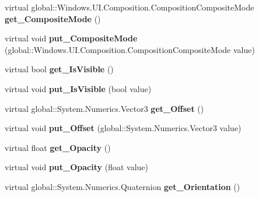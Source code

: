 \begin{DoxyCompactItemize}
virtual global\+::\+Windows.\+U\+I.\+Composition.\+Composition\+Composite\+Mode {\bfseries get\+\_\+\+Composite\+Mode} ()
\item 
\mbox{\label{class_windows_1_1_u_i_1_1_composition_1_1_visual_ad6c8a2e02e7ec62e2dd9406efe0e37b1}} 
virtual void {\bfseries put\+\_\+\+Composite\+Mode} (global\+::\+Windows.\+U\+I.\+Composition.\+Composition\+Composite\+Mode value)
\item 
\mbox{\label{class_windows_1_1_u_i_1_1_composition_1_1_visual_a3a7d203bd59ea8d7b4bc1978ab0fa1f9}} 
virtual bool {\bfseries get\+\_\+\+Is\+Visible} ()
\item 
\mbox{\label{class_windows_1_1_u_i_1_1_composition_1_1_visual_a81c567ec2b046085736b6354b159e7cd}} 
virtual void {\bfseries put\+\_\+\+Is\+Visible} (bool value)
\item 
\mbox{\label{class_windows_1_1_u_i_1_1_composition_1_1_visual_a905246c15eda186bee3efd6359a4ad4b}} 
virtual global\+::\+System.\+Numerics.\+Vector3 {\bfseries get\+\_\+\+Offset} ()
\item 
\mbox{\label{class_windows_1_1_u_i_1_1_composition_1_1_visual_a5ae1120de010788273be8a5ba125758b}} 
virtual void {\bfseries put\+\_\+\+Offset} (global\+::\+System.\+Numerics.\+Vector3 value)
\item 
\mbox{\label{class_windows_1_1_u_i_1_1_composition_1_1_visual_aefe015d14edbd0b01c59658d842ee6b6}} 
virtual float {\bfseries get\+\_\+\+Opacity} ()
\item 
\mbox{\label{class_windows_1_1_u_i_1_1_composition_1_1_visual_ac9c346d6488aba1731166730bd1abb6c}} 
virtual void {\bfseries put\+\_\+\+Opacity} (float value)
\item 
\mbox{\label{class_windows_1_1_u_i_1_1_composition_1_1_visual_a3cd98e040ae25a3b0e41adff6ce17cde}} 
virtual global\+::\+System.\+Numerics.\+Quaternion {\bfseries get\+\_\+\+Orientation} ()

\end{DoxyCompactItemize}
